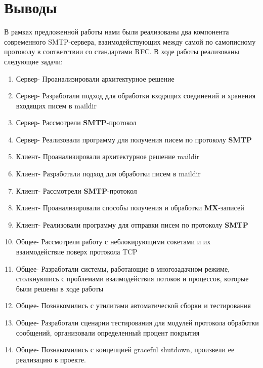 \documentclass[a4paper,12pt]{report}
\begin{document}

\chapter{Выводы}

В рамках предложенной работы нами были реализованы два компонента современного SMTP-сервера, взаимодействующих между самой по самописному протоколу в соответствии со стандартами RFC. В ходе работы реализованы следующие задачи: \\
\begin{enumerate}
	\item Сервер- Проанализировали архитектурное решение
    \item Сервер- Разработали подход для обработки входящих соединений и хранения входящих писем в maildir
    \item Сервер- Рассмотрели \textbf{SMTP}-протокол
    \item Сервер- Реализовали программу для получения писем по протоколу \textbf{SMTP}
    \item Клиент- Проанализировали архитектурное решение maildir
    \item Клиент- Разработали подход для обработки писем в maildir 
    \item Клиент- Рассмотрели \textbf{SMTP}-протокол
    \item Клиент- Проанализировали способы получения и обработки \textbf{MX}-записей
    \item Клиент- Реализовали программу для отправки писем по протоколу \textbf{SMTP}
    \item Общее- Рассмотрели работу с неблокирующими сокетами и их взаимодействие поверх протокола TCP
    \item Общее- Разработали системы, работающие в многозадачном режиме, столкнувшись с проблемами взаимодействия потоков и процессов, которые были решены в ходе работы
    \item Общее- Познакомились с утилитами автоматической сборки и тестирования
    \item Общее- Разработали сценарии тестирования для модулей протокола обработки сообщений, организовали определенный процент покрытия
    \item Общее- Познакомились с концепцией graceful shutdown, произвели ее реализацию в проекте.
\end{enumerate}
\end{document}
